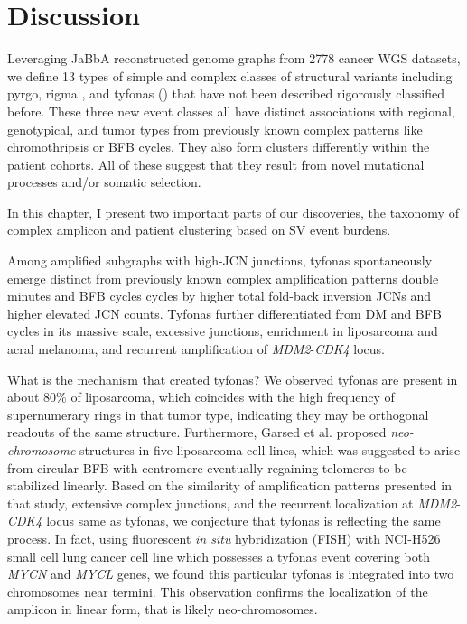 \documentclass[phd,tocprelim]{cornell}
\begin{document}
\section{Discussion}
Leveraging JaBbA reconstructed genome graphs from 2778 cancer WGS datasets, we define 13 types of simple and complex classes of structural variants including pyrgo, rigma \cite{Hadi2020-um}, and tyfonas () that have not been described rigorously classified before. These three new event classes all have distinct associations with regional, genotypical, and tumor types from previously known complex patterns like chromothripsis or BFB cycles. They also form clusters differently within the patient cohorts. All of these suggest that they result from novel mutational processes and/or somatic selection.

In this chapter, I present two important parts of our discoveries, the taxonomy of complex amplicon and patient clustering based on SV event burdens.

Among amplified subgraphs with high-JCN junctions, tyfonas spontaneously emerge distinct from previously known complex amplification patterns double minutes and BFB cycles cycles by higher total fold-back inversion JCNs and higher elevated JCN counts. Tyfonas further differentiated from DM and BFB cycles in its massive scale, excessive junctions, enrichment in liposarcoma and acral melanoma, and recurrent amplification of \textit{MDM2}-\textit{CDK4} locus.

What is the mechanism that created tyfonas? We observed tyfonas are present in about 80\% of liposarcoma, which coincides with the high frequency of supernumerary rings in that tumor type, indicating they may be orthogonal readouts of the same structure. Furthermore, Garsed et al. \cite{garsed2014} proposed \textit{neo-chromosome} structures in five liposarcoma cell lines, which was suggested to arise from circular BFB with centromere eventually regaining telomeres to be stabilized linearly. Based on the similarity of amplification patterns presented in that study, extensive complex junctions, and the recurrent localization at \textit{MDM2}-\textit{CDK4} locus same as tyfonas, we conjecture that tyfonas is reflecting the same process. In fact, using fluorescent \textit{in situ} hybridization (FISH) with NCI-H526 small cell lung cancer cell line which possesses a tyfonas event covering both \textit{MYCN} and \textit{MYCL} genes, we found this particular tyfonas is integrated into two chromosomes near termini. This observation confirms the localization of the amplicon in linear form, that is likely neo-chromosomes.
\end{document}
